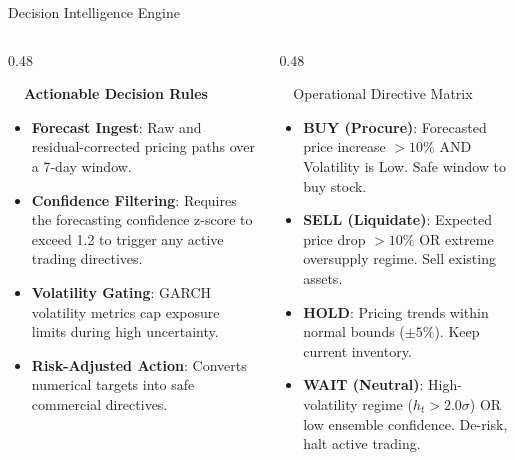 \documentclass{beamer}
\begin{document}
\begin{frame}{Decision Intelligence Engine}
\vspace{-0.2cm}

\begin{columns}[T]
    \begin{column}{0.48\textwidth}
        \begin{smallcard}[0.98\textwidth, top=3pt, bottom=3pt, left=4pt, right=4pt, boxsep=0.5pt]
            \centering \textbf{\textcolor{primaryDark}{\small {}~~Actionable Decision Rules}}
            \vspace{0.08cm}
            \fontsize{6.8pt}{8.2pt}\selectfont
            \begin{itemize}\setlength\itemsep{4pt}\setlength\parskip{0pt}
                \item \textbf{Forecast Ingest}: Raw and residual-corrected pricing paths over a 7-day window.
                \item \textbf{Confidence Filtering}: Requires the forecasting confidence z-score to exceed 1.2 to trigger any active trading directives.
                \item \textbf{Volatility Gating}: GARCH volatility metrics cap exposure limits during high uncertainty.
                \item \textbf{Risk-Adjusted Action}: Converts numerical targets into safe commercial directives.
            \end{itemize}
        \end{smallcard}
    \end{column}
    
    \begin{column}{0.48\textwidth}
        \begin{successcard}[height=4.6cm]{~~Operational Directive Matrix}
            \fontsize{6.8pt}{8.2pt}\selectfont
            \begin{itemize}\setlength\itemsep{3pt}\setlength\parskip{0pt}
                \item \textbf{BUY (Procure)}: Forecasted price increase $> 10\%$ AND Volatility is Low. Safe window to buy stock.
                \item \textbf{SELL (Liquidate)}: Expected price drop $> 10\%$ OR extreme oversupply regime. Sell existing assets.
                \item \textbf{HOLD}: Pricing trends within normal bounds ($\pm 5\%$). Keep current inventory.
                \item \textbf{WAIT (Neutral)}: High-volatility regime ($h_t > 2.0\sigma$) OR low ensemble confidence. De-risk, halt active trading.
            \end{itemize}
        \end{successcard}
    \end{column}
\end{columns}


\end{frame}
\end{document}
